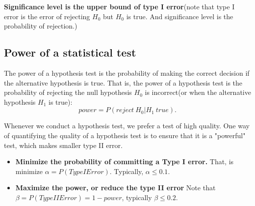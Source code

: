 \begin{refsection}
\begin{remark}
\textbf{Significance level is the upper bound of type I error}(note that type I error is the error of rejecting $H_0$ but $H_0$ is true. And significance level is the probability of rejection.)
\end{remark}



\subsection{Power of a statistical test}










\begin{definition}
The power of a hypothesis test is the probability of making the correct decision if the alternative hypothesis is true. That is, the power of a hypothesis test is the probability of rejecting the null hypothesis $H_0$ is incorrect(or when the alternative hypothesis $H_1$ is true):
$$power = P(reject ~ H_0| H_1 ~ true).$$
\end{definition}

\begin{remark}[motivations]
	Whenever we conduct a hypothesis test, we prefer a test of high quality. One way of quantifying the quality of a hypothesis test is to ensure that it is a "powerful" test, which makes smaller type II error. 
\end{remark}

\begin{remark}\hfill
\begin{itemize}
	\item \textbf{Minimize the probability of committing a Type I error.} That, is minimize $\alpha = P(Type I Error)$. Typically, $\alpha \leq 0.1$.
	\item \textbf{Maximize the power, or reduce the type II error} Note that $\beta = P(Type II Error) = 1 - power$, typically $\beta \leq 0.2$.
\end{itemize}
\end{remark}




\end{refsection}
